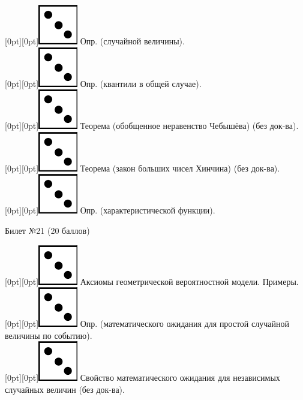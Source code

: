 \documentclass[10pt]{article}
\begin{document}
\raisebox{-1pt}[0pt][0pt]{\includegraphics[width=0.02\linewidth]{3.png}} Опр. (случайной величины). \\ 

\raisebox{-1pt}[0pt][0pt]{\includegraphics[width=0.02\linewidth]{3.png}}   Опр. (квантили в общей случае). \\

\raisebox{-1pt}[0pt][0pt]{\includegraphics[width=0.02\linewidth]{3.png}} Теорема (обобщенное неравенство Чебышёва) (без док-ва). \\

\raisebox{-1pt}[0pt][0pt]{\includegraphics[width=0.02\linewidth]{3.png}} Теорема (закон больших чисел Хинчина) (без док-ва). \\

\raisebox{-1pt}[0pt][0pt]{\includegraphics[width=0.02\linewidth]{3.png}} Опр. (характеристической функции). \\

\begin{center} {\Large Билет №21 (20 баллов)} \end{center}

\raisebox{-1pt}[0pt][0pt]{\includegraphics[width=0.02\linewidth]{3.png}} Аксиомы геометрической вероятностной модели. Примеры. \\

\raisebox{-1pt}[0pt][0pt]{\includegraphics[width=0.02\linewidth]{3.png}} Опр. (математического ожидания для простой случайной величины по событию). \\

\raisebox{-1pt}[0pt][0pt]{\includegraphics[width=0.02\linewidth]{3.png}} Свойство  математического ожидания для независимых случайных величин (без док-ва). \\
\end{document}
